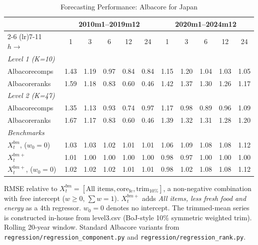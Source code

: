 \begin{table}[htbp]
\centering
\caption{Forecasting Performance: Albacore for Japan}
\label{tab:horizon_table_rolling}
\begin{tabular}{lcccccccccc}
\toprule
 & \multicolumn{5}{c}{2010m1--2019m12} & \multicolumn{5}{c}{2020m1--2024m12} \\
\cmidrule(lr){2-6} \cmidrule(lr){7-11}
$h \to$ & 1 & 3 & 6 & 12 & 24 & 1 & 3 & 6 & 12 & 24 \\
\midrule
\multicolumn{11}{l}{\textit{Level 1 (K=10)}} \\
Albacorecomps & 1.43 & 1.19 & 0.97 & 0.84 & 0.84 & 1.15 & 1.20 & 1.04 & 1.03 & 1.05 \\
Albacoreranks & 1.59 & 1.18 & 0.83 & 0.60 & 0.46 & 1.42 & 1.37 & 1.30 & 1.26 & 1.17 \\
\multicolumn{11}{l}{\textit{Level 2 (K=47)}} \\
Albacorecomps & 1.35 & 1.13 & 0.93 & 0.74 & 0.97 & 1.17 & 0.98 & 0.89 & 0.96 & 1.09 \\
Albacoreranks & 1.67 & 1.17 & 0.83 & 0.60 & 0.46 & 1.39 & 1.32 & 1.31 & 1.28 & 1.20 \\
\multicolumn{11}{l}{\textit{Benchmarks}} \\
$X^{bm}_t$, ($w_0{=}0$) & 1.03 & 1.03 & 1.02 & 1.01 & 1.01 & 1.06 & 1.09 & 1.08 & 1.08 & 1.12 \\
$X^{bm+}_t$ & 1.01 & 1.00 & 1.00 & 1.00 & 1.00 & 0.98 & 0.97 & 1.00 & 1.00 & 1.00 \\
$X^{bm+}_t$, ($w_0{=}0$) & 1.02 & 1.02 & 1.02 & 1.01 & 1.01 & 0.98 & 1.02 & 1.08 & 1.08 & 1.12 \\
\bottomrule
\end{tabular}
\begin{tablenotes}\footnotesize\item RMSE relative to $X^{bm}_t = [\text{All items}, \text{core}_{\text{fe}}, \text{trim}_{10\%}]$, a non-negative combination with free intercept ($w \ge 0$, $\sum w = 1$). $X^{bm+}_t$ adds \textit{All items, less fresh food and energy} as a 4th regressor. $w_0 = 0$ denotes no intercept. The trimmed-mean series is constructed in-house from level3.csv (BoJ-style 10\% symmetric weighted trim). Rolling 20-year window. Standard Albacore variants from \texttt{regression/regression\_component.py} and \texttt{regression/regression\_rank.py}.\end{tablenotes}
\end{table}
